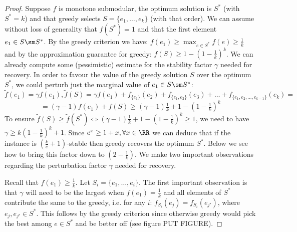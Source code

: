 \begin{proof}
Suppose $f$ is monotone submodular, the optimum solution is $S^*$ (with $S^*=k$) and that greedy selects $S=\{e_1,\dots,e_k\}$ (with that order). We can assume without loss of generality that $f(S^*)=1$ and that the first element $e_1 \in S\sm S^*$. By the greedy criterion we have: $f(e_1)\ge \max_{e\in S^*}f(e)\ge \tfrac{1}{k}$ and by the approximation guarantee for greedy: $f(S)\ge 1-(1-\tfrac{1}{k})^k$. We can already compute some (pessimistic) estimate for the stability factor $\gamma$ needed for recovery. In order to favour the value of the greedy solution $S$ over the optimum $S^*$, we could perturb just the marginal value of $e_1\in S\sm S^*$:
\[
\tilde{f}(e_1)=\gamma f(e_1), \tilde{f}(S)=\gamma f(e_1) + f_{\{e_1\}}(e_2)+f_{\{e_1,e_2\}}(e_3)+\dots+f_{\{e_1,e_2,\dots,e_{k-1}\}}(e_k)=
\]
\[
=(\gamma-1) f(e_1)+f(S)\ge (\gamma-1)\tfrac{1}{k}+1-(1-\tfrac{1}{k})^k
\]
To ensure $\tilde{f}(S)\ge \tilde{f}(S^*) \iff (\gamma-1)\tfrac{1}{k}+1-(1-\tfrac{1}{k})^k\ge 1$, we need to have $\gamma\ge k(1-\tfrac{1}{k})^k+1$. Since $e^x\ge1+x, \forall x\in \RR$ we can deduce that if the instance is $(\tfrac{k}{e}+1)$-stable then greedy recovers the optimum $S^*$. Below we see how to bring this factor down to $(2-\tfrac{1}{k})$. We make two important observations regarding the perturbation factor $\gamma$ needed for recovery.

Recall that $f(e_1)\ge \tfrac{1}{k}$. Let $S_i=\{e_1,\dots,e_i\}$. The first important observation is that $\gamma$ will need to be the largest when $f(e_1) = \tfrac{1}{k}$ and all elements of $S^*$ contribute the same to the greedy, i.e. for any $i$: $f_{S_i}(e_j)=f_{S_i}(e_{j'})$, where $e_j,e_{j'}\in S^*$. This follows by the greedy criterion since otherwise greedy would pick the best among $e \in S^*$ and be better off (see figure PUT FIGURE). 


\end{proof}
